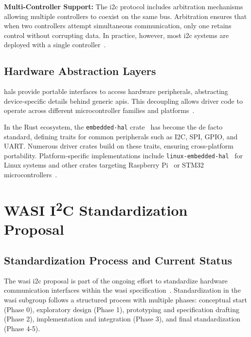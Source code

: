 \textbf{Multi-Controller Support:} The \acrshort{i2c} protocol includes arbitration mechanisms allowing multiple controllers to coexist on the same bus. Arbitration ensures that when two controllers attempt simultaneous communication, only one retains control without corrupting data. In practice, however, most \acrshort{i2c} systems are deployed with a single controller~\cite{i2c_specification}.

\subsection{Hardware Abstraction Layers}
\label{subsec:hal-embedded}

\acrfull{hal}s provide portable interfaces to access hardware peripherals, abstracting device-specific details behind generic \acrshort{api}s. This decoupling allows driver code to operate across different microcontroller families and platforms~\cite{hal}.  

In the Rust ecosystem, the \texttt{embedded-hal} crate~\cite{embedded_hal_crate} has become the de facto standard, defining traits for common peripherals such as I2C, SPI, GPIO, and UART. Numerous driver crates build on these traits, ensuring cross-platform portability. Platform-specific implementations include \texttt{linux-embedded-hal}~\cite{linux_embedded_hal_crate} for Linux systems and other crates targeting Raspberry Pi~\cite{rppal_crate} or STM32 microcontrollers~\cite{stm_hal_crate}.

\section{WASI I\textsuperscript{2}C Standardization Proposal}
\label{sec:wasi-i2c-proposal}

\subsection{Standardization Process and Current Status}
\label{subsec:i2c-standardization-process}

The \acrshort{wasi} \acrshort{i2c} proposal is part of the ongoing effort to standardize hardware communication interfaces within the \acrshort{wasi} specification~\cite{wasi_i2c_proposal}. Standardization in the \acrshort{wasi} subgroup follows a structured process with multiple phases: conceptual start (Phase 0), exploratory design (Phase 1), prototyping and specification drafting (Phase 2), implementation and integration (Phase 3), and final standardization (Phase 4-5).  

